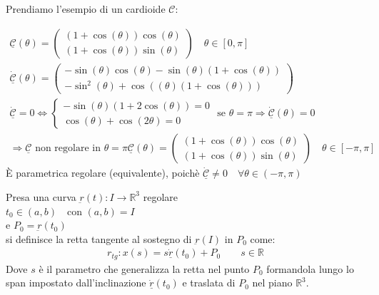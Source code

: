 \documentclass[a4paper, oneside]{article}
\begin{document}
\begin{example}
    Prendiamo l'esempio di un cardioide $\mathcal{C}$:
    \begin{center}
    \end{center}
\begin{gather*}
        \underline{\mathcal{C}}(\theta) = 
        \begin{pmatrix}
            (1 + \cos(\theta)) \cos(\theta)\\
            (1 + \cos(\theta)) \sin(\theta)
        \end{pmatrix}\quad \theta \in [0,\pi]\\
        \underline{\dot{\mathcal{C}}} (\theta) = 
        \begin{pmatrix}
            -\sin(\theta)\cos(\theta) - \sin(\theta)(1 + \cos(\theta))\\
            -\sin^2(\theta) + \cos((\theta)(1 + \cos(\theta)))
        \end{pmatrix}\\
        \underline{\mathcal{\dot{C}}} = 0 \Leftrightarrow 
        \begin{cases}
            - \sin(\theta) (1+2\cos(\theta)) = 0\\
            \cos(\theta) + \cos(2 \theta) = 0
        \end{cases} \text{ se } \theta = \pi \Rightarrow \underline{\dot{\mathcal{C}}}(\theta) = 0\\
        \Longrightarrow  \underline{\mathcal{C}} \text{ non regolare in } \theta = \pi
        \underline{\mathcal{C}}(\theta) =
        \begin{pmatrix}
            (1+\cos(\theta)) \cos(\theta)\\
            (1+\cos(\theta)) \sin(\theta)
        \end{pmatrix}\quad \theta \in [-\pi,\pi]
    \end{gather*}
    È parametrica regolare (equivalente), poichè $\underline{\dot{\mathcal{C}}} \neq 0 \quad \forall \theta \in (-\pi, \pi)$
\end{example}
\begin{definition}
    Presa una curva $\underbar{r}(t):I \to \mathbb{R}^3$ regolare\\
     $t_0 \in (a,b) \quad \text{con }(a,b) = I$\\
    e  $P_0 = \underbar{r}(t_0)$ \\
    si definisce la retta tangente al sostegno di $\underbar{r}(I)$ in $P_0$ come:
    \begin{gather*}
        r_{tg}: x(s) = s \underline{\dot{r}}(t_0) + P_0 \qquad s \in \mathbb{R}
    \end{gather*}
    Dove $s$ è il parametro che generalizza la retta nel punto $P_0$ formandola lungo lo span impostato dall'inclinazione $\underline{\dot{r}}(t_0)$ e traslata di $P_0$ nel piano $\mathbb{R}^3$.
\end{definition}
\end{document}

